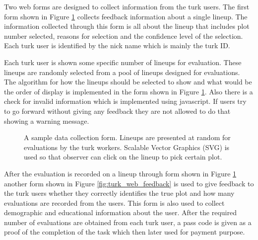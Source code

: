 \documentclass[11pt]{article}
\begin{document}
Two web forms are designed to collect information from the turk users. The first form shown in Figure \ref{fig:turk_web} collects feedback information about a single lineup. The information collected through this form is all about the lineup that includes plot number selected, reasons for selection and the confidence level of the selection. Each turk user is identified by the nick name which is mainly the turk ID. 

Each turk user is shown some specific number of lineups for evaluation. These lineups are randomly selected from a pool of lineups designed for evaluations. The algorithm for how the lineups should be selected to show and what would be the order of display is implemented in the form shown in Figure \ref{fig:turk_web}. Also there is a check for invalid information which is implemented using javascript. If users try to go forward without giving any feedback they are not allowed to do that showing a warning message.

\begin{figure}[hbtp]
   \centering
       \caption{A sample data collection form. Lineups are presented at random for evaluations by the turk workers. Scalable Vector Graphics (SVG) is used so that observer can click on the lineup to pick certain plot.}
       \label{fig:turk_web}
\end{figure}

After the evaluation is recorded on a lineup through form shown in Figure \ref{fig:turk_web} another form shown in Figure \ref{fig:turk_web_feedback} is used to give feedback to the turk users whether they correctly identifies the true plot and how many evaluations are recorded from the users. This form is also used to collect demographic and educational information about the user. After the required number of evaluations are obtained from each turk user, a pass code is given as a proof of the completion of the task which then later used for payment purpose.
\end{document}
